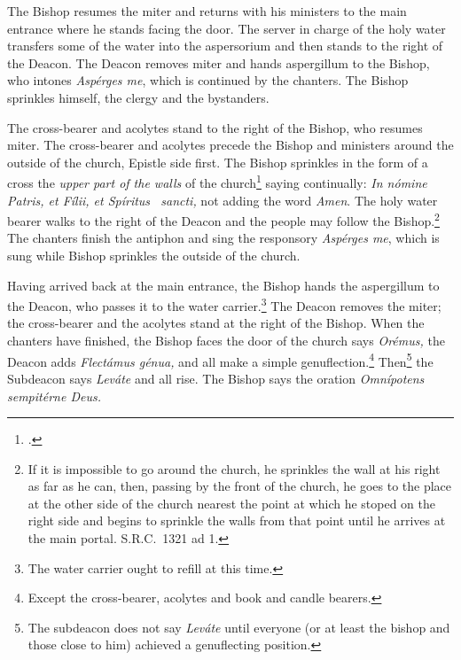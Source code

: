 \documentclass[letterpaper]{report}
\newcommand\src{\textsc{S.R.C.}}
\begin{document}
{    \rubric The Bishop resumes the miter and returns with his ministers to the
    main entrance where he stands facing the door. The server in charge of the
    holy water transfers some of the water into the aspersorium and then stands
    to the right of the Deacon. The Deacon removes miter and hands aspergillum
    to the Bishop, who intones \textit{Asp\'erges me}, which is continued by
    the chanters. The Bishop sprinkles himself, the clergy and the bystanders.

    \rubric The cross-bearer and acolytes stand to the right of the Bishop, who
    resumes miter. The cross-bearer and acolytes precede the Bishop and
    ministers around the outside of the church, Epistle side first. The Bishop
    sprinkles in the form of a cross the \textit{upper part of the walls} of
    the church\footcite[The procession walks around and Bishop sprinkles the
    cemetery also if it be adjacent.][n. 41, p. 44.]{consecranda} saying
    continually: \textit{In nómine Pa\cross tris, et Fí\cross lii, et Spíritus
    \cross\ sancti,} not adding the word \textit{Amen}. The holy water bearer
    walks to the right of the Deacon and the people may follow the
    Bishop.\footnote{If it is impossible to go around the church, he sprinkles
    the wall at his right as far as he can, then, passing by the front of the
    church, he goes to the place at the other side of the church nearest the
    point at which he stoped on the right side and begins to sprinkle the walls
    from that point until he arrives at the main portal. \src\ 1321 ad 1.} The
    chanters finish the antiphon and sing the responsory \textit{Asp\'erges
    me}, which is sung while Bishop sprinkles the outside of the church.

    \rubric Having arrived back at the main entrance, the Bishop hands the
    aspergillum to the Deacon, who passes it to the water carrier.\footnote{The
    water carrier ought to refill at this time.} The Deacon removes the miter;
    the cross-bearer and the acolytes stand at the right of the Bishop. When
    the chanters have finished, the Bishop faces the door of the church says
    \textit{Orémus,} the Deacon adds \textit{Flectámus génua,} and all make a
    simple genuflection.\footnote{Except the cross-bearer, acolytes and book
    and candle bearers.} Then\footnote{The subdeacon does not say
    \textit{Leváte} until everyone (or at least the bishop and those close to
    him) achieved a genuflecting position.} the Subdeacon says \textit{Leváte}
    and all rise. The Bishop says the oration \textit{Omnípotens sempitérne
    Deus.}

}
\end{document}
